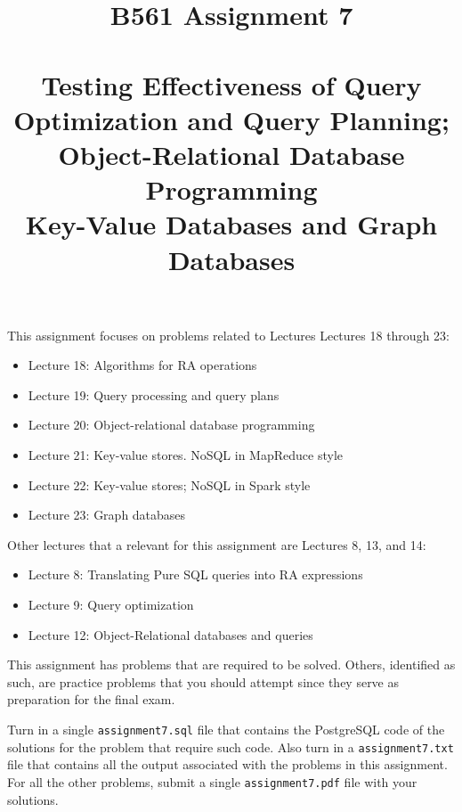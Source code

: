 \documentclass[10pt]{article}
\begin{document}
\title{B561 Assignment 7\\
\ \\
Testing Effectiveness of Query Optimization and Query Planning; \\
Object-Relational Database Programming \\
Key-Value Databases and Graph Databases }
\date{}
\maketitle

This assignment focuses on problems related to Lectures Lectures 18 through 23:
\begin{itemize}
\item Lecture 18:  Algorithms for RA operations
\item Lecture 19:  Query processing and query plans
\item Lecture 20:  Object-relational database programming
\item Lecture 21:  Key-value stores.  NoSQL in MapReduce style
\item Lecture 22:  Key-value stores;  NoSQL in Spark style
\item Lecture 23:  Graph databases
\end{itemize}
Other lectures that a relevant for this assignment are Lectures 8, 13, and 14:
\begin{itemize}
\item Lecture 8:  Translating Pure SQL queries into RA expressions
\item Lecture 9:  Query optimization
\item Lecture 12:  Object-Relational databases and queries
\end{itemize}
\vfill

This assignment has problems that are required to be solved.  Others, identified as such, are practice problems that you should attempt since they serve as preparation for the final exam.

Turn in a single {\tt assignment7.sql} file that contains the PostgreSQL code of the solutions for the problem that require such code.   
Also turn in a {\tt assignment7.txt} file that contains all the output associated with the problems in this assignment.
For all the other problems, submit a single {\tt assignment7.pdf} file with your solutions.
\end{document}
